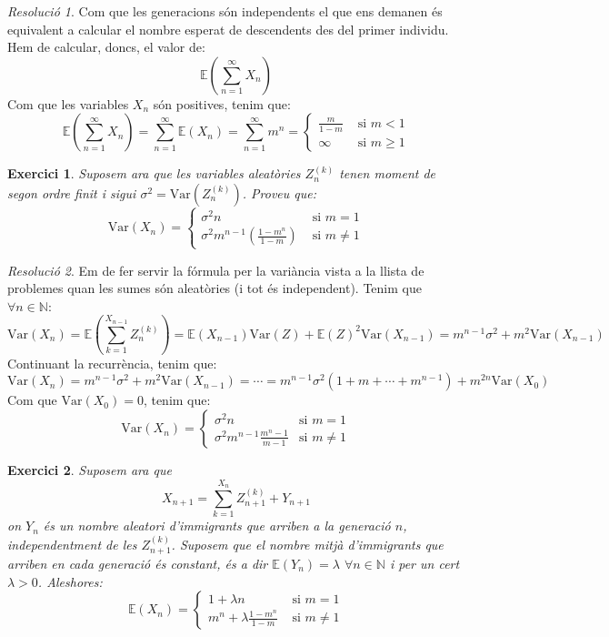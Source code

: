 \documentclass[10pt,a4paper]{article}
\newcommand{\NN}{\ensuremath{\mathbb{N}}} %
\newcommand{\Exp}{\mathbb{E}} %
\newcommand{\Var}{\mathrm{Var}} %
\newtheorem{exercici}{Exercici}
\theoremstyle{definition}
\theoremstyle{remark}
\newtheorem{res}{Resolució}
\begin{document}
\begin{res}
  Com que les generacions són independents el que ens demanen és equivalent a calcular el nombre esperat de descendents des del primer individu. Hem de calcular, doncs, el valor de: $$\Exp\left(\sum_{n=1}^\infty X_n\right)$$
  Com que les variables $X_n$ són positives, tenim que:
  $$\Exp\left(\sum_{n=1}^\infty X_n\right)=\sum_{n=1}^\infty\Exp(X_n)=\sum_{n=1}^\infty m^n=
    \begin{cases}
      \frac{m}{1-m} & \text{ si $m <1$}     \\
      \infty        & \text{ si $m \geq 1$}
    \end{cases}$$
\end{res}
\begin{exercici}
  Suposem ara que les variables aleatòries $Z_n^{(k)}$ tenen moment de segon ordre finit i sigui $\sigma^2=\Var(Z_n^{(k)})$. Proveu que:
  $$\Var(X_n)=
    \begin{cases}
      \sigma^2 n                                    & \text{ si $m=1$}    \\
      \sigma^2m^{n-1}\left(\frac{1-m^n}{1-m}\right) & \text{ si $m\ne 1$}
    \end{cases}
  $$
\end{exercici}
\begin{res}
  Em de fer servir la fórmula per la variància vista a la llista de problemes quan les sumes són aleatòries (i tot és independent). Tenim que $\forall n\in\NN$:
  $$\Var(X_n)=\Exp\left(\sum_{k=1}^{X_{n-1}}Z_n^{(k)}\right)=\Exp(X_{n-1})\Var(Z)+{\Exp(Z)}^2\Var(X_{n-1})=m^{n-1}\sigma^2+m^2\Var(X_{n-1})$$
  Continuant la recurrència, tenim que:
  $$\Var(X_n)=m^{n-1}\sigma^2+m^2\Var(X_{n-1})=\cdots=m^{n-1}\sigma^2(1+m+\cdots+m^{n-1})+m^{2n}\Var(X_0)$$
  Com que $\Var(X_0)=0$, tenim que:
  $$
    \Var(X_n)=
    \begin{cases}
      \sigma^2n                        & \text{si $m=1$}    \\
      \sigma^2m^{n-1}\frac{m^n-1}{m-1} & \text{si $m\ne 1$}
    \end{cases}
  $$
\end{res}
\begin{exercici}
  Suposem ara que $$X_{n+1}=\sum_{k=1}^{X_n}Z_{n+1}^{(k)}+Y_{n+1}$$ on $Y_{n}$ és un nombre aleatori d'immigrants que arriben a la generació $n$, independentment de les $Z_{n+1}^{(k)}$. Suposem que el nombre mitjà d'immigrants que arriben en cada generació és constant, és a dir $\Exp(Y_n)=\lambda$ $\forall n\in\NN$ i per un cert $\lambda>0$. Aleshores:
  $$
    \Exp(X_n)=
    \begin{cases}
      1+ \lambda n                 & \text{ si $m=1$}    \\
      m^n+\lambda\frac{1-m^n}{1-m} & \text{ si $m\ne 1$}
    \end{cases}
  $$
\end{exercici}
\end{document}
